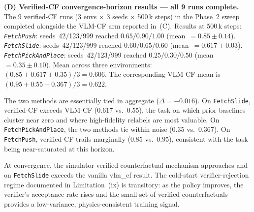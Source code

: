 \documentclass{article}
\begin{document}
\textbf{(D) Verified-CF convergence-horizon results --- all 9 runs complete.}
The 9 verified-CF runs (3 envs $\times$ 3 seeds $\times$ 500\,k steps) in the
Phase~2 sweep completed alongside the VLM-CF arm reported in~(C).
Results at 500\,k steps:
\emph{\texttt{FetchPush}}: seeds~42/123/999 reached $0.65/0.90/1.00$
(mean~$=0.85\!\pm\!0.14$).
\emph{\texttt{FetchSlide}}: seeds~42/123/999 reached $0.60/0.65/0.60$
(mean~$=0.617\!\pm\!0.03$).
\emph{\texttt{FetchPickAndPlace}}: seeds~42/123/999 reached $0.25/0.30/0.50$
(mean~$=0.35\!\pm\!0.10$).
Mean across three environments: $(0.85+0.617+0.35)/3 = 0.606$.
The corresponding VLM-CF mean is $(0.95+0.55+0.367)/3 = 0.622$.

The two methods are essentially tied in aggregate ($\Delta = -0.016$).
On \texttt{FetchSlide}, verified-CF exceeds VLM-CF ($0.617$ vs.\ $0.55$),
the task on which prior baselines cluster near zero and where high-fidelity
relabels are most valuable.
On \texttt{FetchPickAndPlace}, the two methods tie within noise ($0.35$ vs.\ $0.367$).
On \texttt{FetchPush}, verified-CF trails marginally ($0.85$ vs.\ $0.95$),
consistent with the task being near-saturated at this horizon.

At convergence, the simulator-verified counterfactual mechanism approaches
and on \texttt{FetchSlide} exceeds the vanilla vlm\_cf result.
The cold-start verifier-rejection regime documented in Limitation~(ix) is
transitory: as the policy improves, the verifier's acceptance rate rises
and the small set of verified counterfactuals provides a low-variance,
physics-consistent training signal.
\end{document}

